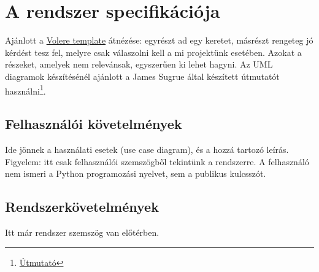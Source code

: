 \chapter{A rendszer specifikációja}



Ajánlott a \href{https://drive.google.com/file/d/1Fmg_N5Zov1e_GZzF8uGK2GAkMDoo0_vm/view?usp=sharing}{Volere template} átnézése: egyrészt ad egy keretet, másrészt rengeteg jó kérdést tesz fel, melyre csak válaszolni kell a mi projektünk esetében. Azokat a részeket, amelyek nem relevánsak, egyszerűen ki lehet hagyni.
Az UML diagramok készítésénél ajánlott a James Sugrue \'altal k\'esz\'itett útmutatót használni\footnote{\href{https://drive.google.com/drive/folders/1ocZsC26FMHKStwkEhZx8H4od6Mk3Deo3}{\'Utmutat\'o}}.


\section{Felhasználói követelmények}


Ide jönnek a használati esetek (use case diagram), és a hozzá tartozó leírás. Figyelem: itt csak felhasználói szemszögből tekintünk a rendszerre. A felhasználó nem ismeri a Python programozási nyelvet, sem a publikus kulcsszót. 






\section{Rendszerkövetelmények}

Itt már rendszer szemszög van előtérben. 

